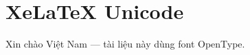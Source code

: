\documentclass{article}
\begin{document}
\section*{XeLaTeX Unicode}
Xin chào Việt Nam — tài liệu này dùng font OpenType.
\end{document}
